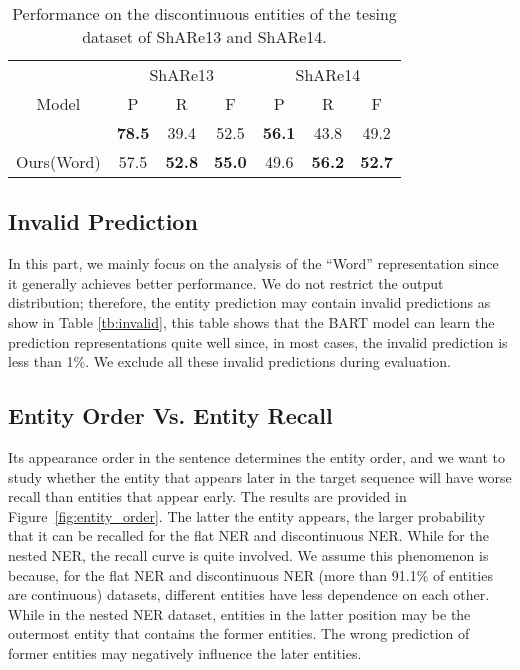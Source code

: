 \documentclass[11pt,a4paper]{article}
\begin{document}
{\tiny{\begin{table}[!hb]
  \centering
  \setlength{\tabcolsep}{2pt}  \begin{tabular}{c|ccc|ccc}
\toprule
      & \multicolumn{3}{c|}{ShARe13} & \multicolumn{3}{c}{ShARe14} \\
  Model    & P       & R       & F       & P       & R       & F       \\
\midrule
  \citet{DBLP:conf/acl/DaiKHP20} & \textbf{78.5}    & 39.4    & 52.5    & \textbf{56.1}    & 43.8    & 49.2    \\
  Ours(Word)  & 57.5   & \textbf{52.8}   & \textbf{55.0}   & 49.6   & \textbf{56.2}   & \textbf{52.7}   \\
\bottomrule
  \end{tabular}
  \caption{Performance on the discontinuous entities of the tesing dataset of ShARe13 and ShARe14.}
  \label{tb:only_dis}
  \end{table}
}}



\subsection{Invalid Prediction}
In this part, we mainly focus on the analysis of the ``Word'' representation since it generally achieves better performance. We do not restrict the output distribution; therefore, the entity prediction may contain invalid predictions as show in Table \ref{tb:invalid}, this table shows that the BART model can learn the prediction representations quite well since, in most cases, the invalid prediction is less than 1\%. We exclude all these invalid predictions during evaluation.



\subsection{Entity Order Vs. Entity Recall}
Its appearance order in the sentence determines the entity order, and we want to study whether the entity that appears later in the target sequence will have worse recall than entities that appear early. The results are provided in Figure~\ref{fig:entity_order}. The latter the entity appears, the larger probability that it can be recalled for the flat NER and discontinuous NER. While for the nested NER, the recall curve is quite involved. We assume this phenomenon is because, for the flat NER and discontinuous NER (more than 91.1\% of entities are continuous) datasets, different entities have less dependence on each other. While in the nested NER dataset, entities in the latter position may be the outermost entity that contains the former entities. The wrong prediction of former entities may negatively influence the later entities.
\end{document}
